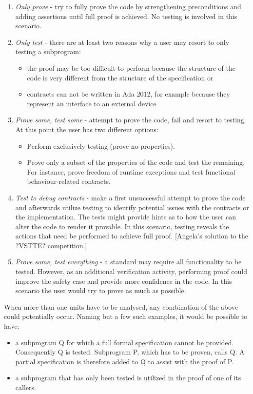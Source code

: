 \documentclass{llncs}
\begin{document}
\begin {enumerate}
\item \emph{Only prove} - try to fully prove the code by strengthening
  preconditions and adding assertions until full proof is achieved. No
  testing is involved in this scenario.
\item \emph{Only test} - there are at least two reasons why a user may
  resort to only testing a subprogram:
  \begin{itemize}
  \item the proof may be too difficult to perform because the
    structure of the code is very different from the structure of the
    specification or
  \item contracts can not be written in Ada 2012, for example because
    they represent an interface to an external device
  \end{itemize}
\item \emph{Prove some, test some} - attempt to prove the code, fail
  and resort to testing. At this point the user has two different
  options:
  \begin{itemize}
  \item Perform exclusively testing (prove no properties).
  \item Prove only a subset of the properties of the code and test the
    remaining. For instance, prove freedom of runtime exceptions and
    test functional behaviour-related contracts.
  \end{itemize}
\item \emph{Test to debug contracts} - make a first unsuccessful
  attempt to prove the code and afterwards utilize testing to identify
  potential issues with the contracts or the implementation. The tests
  might provide hints as to how the user can alter the code to render
  it provable. In this scenario, testing reveals the actions that need
  be performed to achieve full proof. [Angela's solution to the
  ?VSTTE? competition.]
\item \emph{Prove some, test everything} - a standard may require all
  functionality to be tested. However, as an additional verification
  activity, performing proof could improve the safety case and provide
  more confidence in the code. In this scenario the user would try to
  prove as much as possible.
\end{enumerate}

When more than one units have to be analysed, any combination of the
above could potentially occur. Naming but a few such examples, it
would be possible to have:
\begin{itemize}
\item a subprogram Q for which a full formal specification cannot be
  provided. Consequently Q is tested. Subprogram P, which has to be
  proven, calls Q. A partial specification is therefore added to Q to
  assist with the proof of P.
\item a subprogram that has only been tested is utilized in the proof
  of one of its callers.
\end{itemize}
\end{document}
